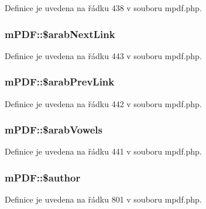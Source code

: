 Definice je uvedena na řádku 438 v souboru mpdf.\-php.

\hypertarget{classm_p_d_f_a5663b62d8f3e6b411a1bd66347271bc4}{
\subsubsection[{\$arab\-Next\-Link}]{\setlength{\rightskip}{0pt plus 5cm}m\-P\-D\-F\-::\$arab\-Next\-Link}}\label{classm_p_d_f_a5663b62d8f3e6b411a1bd66347271bc4}


Definice je uvedena na řádku 443 v souboru mpdf.\-php.

\hypertarget{classm_p_d_f_aae5614153aadbd40b283208c43b4ddea}{
\subsubsection[{\$arab\-Prev\-Link}]{\setlength{\rightskip}{0pt plus 5cm}m\-P\-D\-F\-::\$arab\-Prev\-Link}}\label{classm_p_d_f_aae5614153aadbd40b283208c43b4ddea}


Definice je uvedena na řádku 442 v souboru mpdf.\-php.

\hypertarget{classm_p_d_f_a12dc26d246bbdcd747bbb72f8938e202}{
\subsubsection[{\$arab\-Vowels}]{\setlength{\rightskip}{0pt plus 5cm}m\-P\-D\-F\-::\$arab\-Vowels}}\label{classm_p_d_f_a12dc26d246bbdcd747bbb72f8938e202}


Definice je uvedena na řádku 441 v souboru mpdf.\-php.

\hypertarget{classm_p_d_f_a3796ae6cd7b69f3b9e3acf5dc7094f12}{
\subsubsection[{\$author}]{\setlength{\rightskip}{0pt plus 5cm}m\-P\-D\-F\-::\$author}}\label{classm_p_d_f_a3796ae6cd7b69f3b9e3acf5dc7094f12}


Definice je uvedena na řádku 801 v souboru mpdf.\-php.



